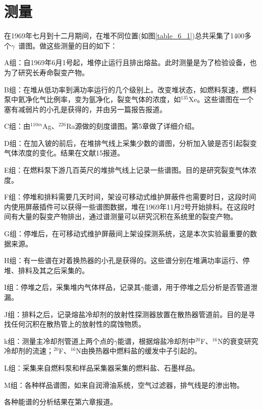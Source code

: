 \chapter{测量}
在1969年七月到十二月期间，在堆不同位置(如图\ref{table_6_1})总共采集了1400多个$\gamma$\ 谱图。做这些测量的目的如下：

A组：自1969年6月1号起，堆停止运行且排出熔盐。此时测量是为了检验设备，也为了研究长寿命裂变产物。

B组：在堆从低功率到满功率运行的几个级别上。改变堆状态，如燃料泵速，燃料泵中氦净化气比例率，变为氩净化，裂变气体的浓度，如$^{135}$Xe。这些谱图在一个塞有减弱片的小孔是获得的，并由另一篇报告报道。

C组：由$^{110m}$Ag、$^{226}$Ra源做的刻度谱图。第5章做了详细介绍。

D组：在加入铍的前后，在堆排气线上采集少数的谱图，分析加入铍是否引起裂变气体浓度的变化。结果在文献15报道。

E组：在燃料泵下游几百英尺的堆排气线上记录一些谱图。目的是研究裂变气体浓度。

F组：停堆和排料需要几天时间，架设可移动式维护屏蔽件也需要时日，这段时间内使用屏蔽插件可以获得一些谱图数据，堆在1969年11月2号开始排料。在这段时间有大量的裂变产物排出，通过谱测量可以研究沉积在系统里的裂变产物。

G组：停堆后，在可移动式维护屏蔽间上架设探测系统，这是本次实验最重要的数据来源。

H组：有一些谱在对着换热器的小孔是获得的。这些谱分别在堆满功率运行、停堆、排料及其之后采集的。

I组：停堆之后，采集堆内气体样品，记录其$\gamma$能谱，用于停堆之后分析是否管道泄漏。

J组：排料之后，记录熔盐冷却剂的放射性探测器放置在散热器管道前。目的是寻找任何沉积在散热管上的放射性的腐蚀物质。

k组：测量主冷却剂管道上两个点的$\gamma$能谱，根据熔盐冷却剂中$^{20}$F、$^{16}$N的衰变研究冷却剂的流速；$^{20}$F、$^{16}$N由换热器中燃料盐的缓发中子引起的。

L组：采集来自燃料泵和样品采集器采集的燃料盐、石墨样品。

M组：各种样品谱图，如来自润滑油系统，空气过滤器，排气线是的渗出物。

各种能谱的分析结果在第六章报道。


